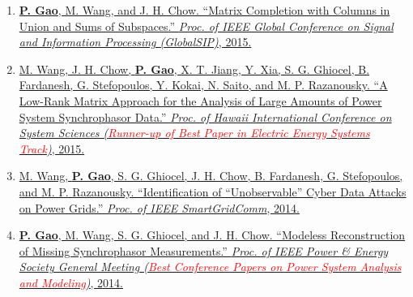 \documentclass[10pt]{article}
\makeatletter
\newlength{\bibhang}
\newlength{\bibsep}
 {\@listi \global\bibsep\itemsep \global\advance\bibsep by\parsep}
\newenvironment{bibsection}%
        {\begin{enumerate}{}{%
       \setlength{\leftmargin}{\bibhang}%
       \setlength{\itemindent}{-\leftmargin}%
       \setlength{\itemsep}{\bibsep}%
       \setlength{\parsep}{\z@}%
        \setlength{\partopsep}{0pt}%
        \setlength{\topsep}{0pt}}}
        {\end{enumerate}\vspace{-.6\baselineskip}}
\renewcommand{\section}[1]{\pagebreak[3]%
    \hyphenpenalty=10000%
    \vspace{1.3\baselineskip}%
    \phantomsection\addcontentsline{toc}{section}{#1}%
    \noindent\llap{\scshape\smash{\parbox[t]{\marginparwidth}{\raggedright #1}}}%
    \vspace{-\baselineskip}\par}
\makeatother
\begin{document}
\begin{bibsection}
\item \href{}{{\bf P. Gao}, M. Wang, and J. H. Chow. ``Matrix Completion with Columns in Union and Sums of Subspaces.'' \emph{Proc. of IEEE Global Conference on Signal and Information Processing (GlobalSIP)}, 2015.}
	
\item \href{}{M. Wang, J. H. Chow, {\bf P. Gao}, X. T. Jiang, Y. Xia, S. G. Ghiocel, B. Fardanesh, G. Stefopoulos, Y. Kokai, N. Saito, and M. P. Razanousky. ``A Low-Rank Matrix Approach for the Analysis of Large Amounts of Power System Synchrophasor Data.'' \emph{Proc. of Hawaii International Conference on System Sciences (\textcolor{red}{Runner-up of Best Paper in Electric Energy Systems Track})}, 2015.}
	
\item \href{}{M. Wang, {\bf P. Gao}, S. G. Ghiocel, J. H. Chow, B. Fardanesh, G. Stefopoulos, and M. P. Razanousky. ``Identification of ``Unobservable'' Cyber Data Attacks on Power Grids.'' \emph{Proc. of IEEE SmartGridComm}, 2014.}
	
\item \href{}{{\bf P. Gao}, M. Wang, S. G. Ghiocel, and J. H. Chow. ``Modeless Reconstruction of Missing Synchrophasor Measurements.'' \emph{Proc. of IEEE Power \& Energy Society General Meeting (\textcolor{red}{Best Conference Papers on Power System Analysis and Modeling})}, 2014.}

\end{bibsection}


	



\end{document}
